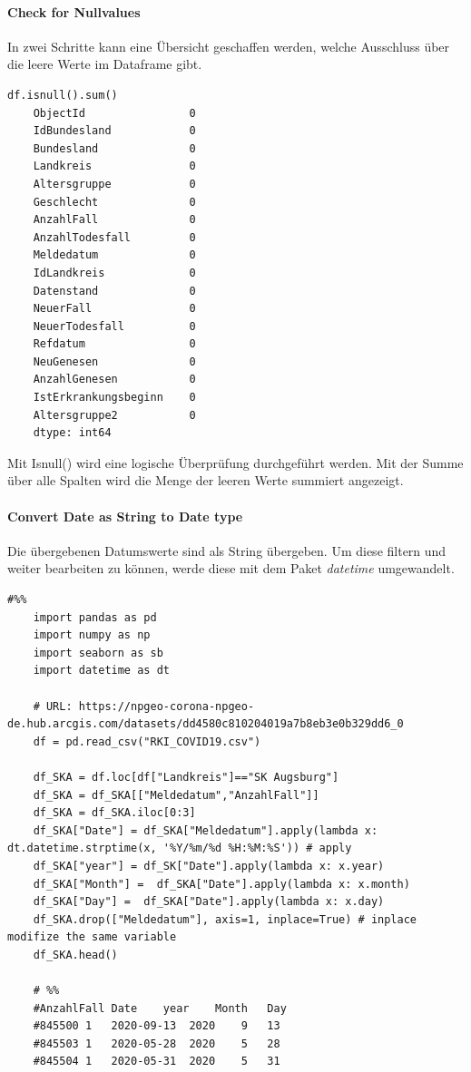 \paragraph{Check for Nullvalues}
In zwei Schritte kann eine Übersicht geschaffen werden, welche Ausschluss über die leere Werte im Dataframe gibt.
\begin{lstlisting}[style=python]
	df.isnull().sum()
	ObjectId                0
	IdBundesland            0
	Bundesland              0
	Landkreis               0
	Altersgruppe            0
	Geschlecht              0
	AnzahlFall              0
	AnzahlTodesfall         0
	Meldedatum              0
	IdLandkreis             0
	Datenstand              0
	NeuerFall               0
	NeuerTodesfall          0
	Refdatum                0
	NeuGenesen              0
	AnzahlGenesen           0
	IstErkrankungsbeginn    0
	Altersgruppe2           0
	dtype: int64
\end{lstlisting}
Mit Isnull() wird eine logische Überprüfung durchgeführt werden. Mit der Summe über alle Spalten wird die Menge der leeren Werte summiert angezeigt.

\paragraph{Convert Date as String to Date type}
Die übergebenen Datumswerte sind als String übergeben. Um diese filtern und weiter bearbeiten zu können, werde diese mit dem Paket \textit{datetime} umgewandelt.
\begin{lstlisting}[style=python]
	#%%
	import pandas as pd
	import numpy as np
	import seaborn as sb
	import datetime as dt
	
	# URL: https://npgeo-corona-npgeo-de.hub.arcgis.com/datasets/dd4580c810204019a7b8eb3e0b329dd6_0
	df = pd.read_csv("RKI_COVID19.csv")
	
	df_SKA = df.loc[df["Landkreis"]=="SK Augsburg"]
	df_SKA = df_SKA[["Meldedatum","AnzahlFall"]]
	df_SKA = df_SKA.iloc[0:3]
	df_SKA["Date"] = df_SKA["Meldedatum"].apply(lambda x: dt.datetime.strptime(x, '%Y/%m/%d %H:%M:%S')) # apply 
	df_SKA["year"] = df_SK["Date"].apply(lambda x: x.year)
	df_SKA["Month"] =  df_SKA["Date"].apply(lambda x: x.month)
	df_SKA["Day"] =  df_SKA["Date"].apply(lambda x: x.day)
	df_SKA.drop(["Meldedatum"], axis=1, inplace=True) # inplace modifize the same variable
	df_SKA.head()
	
	# %%
	#AnzahlFall	Date	year	Month	Day
	#845500	1	2020-09-13	2020	9	13
	#845503	1	2020-05-28	2020	5	28
	#845504	1	2020-05-31	2020	5	31
\end{lstlisting}

